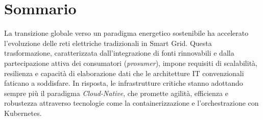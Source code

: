 \chapter*{Sommario} %
\label{sommario}








La transizione globale verso un paradigma energetico sostenibile ha accelerato l'evoluzione delle reti elettriche tradizionali in Smart Grid. Questa trasformazione, caratterizzata dall'integrazione di fonti rinnovabili e dalla partecipazione attiva dei consumatori (\textit{prosumer}), impone requisiti di scalabilità, resilienza e capacità di elaborazione dati che le architetture IT convenzionali faticano a soddisfare. In risposta, le infrastrutture critiche stanno adottando sempre più il paradigma \textit{Cloud-Native}, che promette agilità, efficienza e robustezza attraverso tecnologie come la containerizzazione e l'orchestrazione con Kubernetes.


